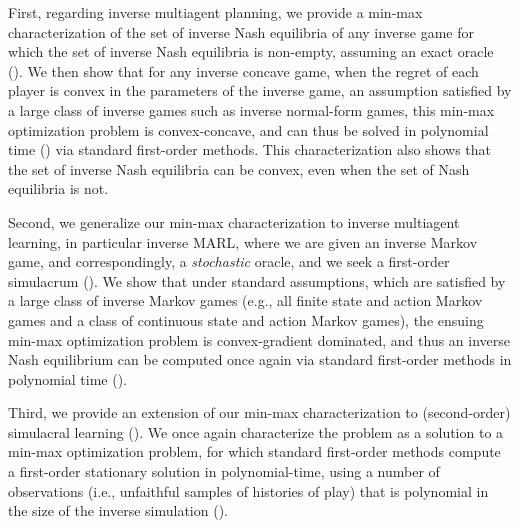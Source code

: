 
First, regarding inverse multiagent planning, we provide a min-max characterization of the set of inverse Nash equilibria of any inverse game for which the set of inverse Nash equilibria is non-empty, assuming an exact oracle ().
We then show that for any inverse concave game, when the regret of each player is convex in the parameters of the inverse game, an assumption satisfied by a large class of inverse games such as inverse normal-form games, this min-max optimization problem is convex-concave, and can thus be solved in polynomial time () via standard first-order methods.
This characterization also shows that the set of inverse Nash equilibria can be convex, even when the set of Nash equilibria is not.

Second, we generalize our min-max characterization to inverse multiagent learning, in particular inverse MARL, where we are given an inverse Markov game, and correspondingly, a \emph{stochastic\/} oracle, and we seek a first-order simulacrum ().
We show that under standard assumptions, which are satisfied by a large class of inverse Markov games (e.g., all finite state and action Markov games and a class of continuous state and action Markov games), the ensuing min-max optimization problem is convex-gradient dominated, and thus an inverse Nash equilibrium can be computed once again via standard first-order methods in polynomial time ().

Third, we provide an extension of our min-max characterization to (second-order) simulacral learning ().
We once again characterize the problem as a solution to a min-max optimization problem, for which standard first-order methods compute a first-order stationary \citep{lin2020gradient} solution in polynomial-time, using a number of observations (i.e., unfaithful samples of histories of play) that is polynomial in the size of the inverse simulation ().

